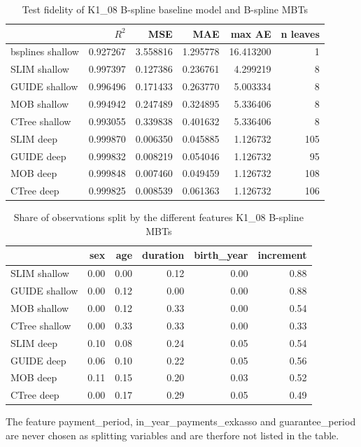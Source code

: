 \begin{table}[!htb]
\caption{Test fidelity of K1\_08 B-spline baseline model and  B-spline MBTs}
\centering \small
\begin{tabular}[t]{l|r|r|r|r|r}
\hline
  & $R^2$ & MSE & MAE & max AE & n leaves\\
\hline
bsplines shallow & 0.927267 & 3.558816 & 1.295778 & 16.413200 & 1\\
\hline
SLIM shallow & 0.997397 & 0.127386 & 0.236761 & 4.299219 & 8\\
GUIDE shallow & 0.996496 & 0.171433 & 0.263770 & 5.003334 & 8\\
MOB shallow & 0.994942 & 0.247489 & 0.324895 & 5.336406 & 8\\
CTree shallow & 0.993055 & 0.339838 & 0.401632 & 5.336406 & 8\\
\hline
SLIM deep & 0.999870 & 0.006350 & 0.045885 & 1.126732 & 105\\
GUIDE deep & 0.999832 & 0.008219 & 0.054046 & 1.126732 & 95\\
MOB deep & 0.999848 & 0.007460 & 0.049459 & 1.126732 & 108\\
CTree deep & 0.999825 & 0.008539 & 0.061363 & 1.126732 & 106\\
\hline
\end{tabular}
\label{tab:ins_k108_bsplines_surrogates_perf_test}

\end{table}


\begin{table}[!htb]
\caption{Share of observations split by the different features K1\_08 B-spline MBTs}
\centering \small
\begin{tabular}[t]{l|r|r|r|r|r}
\hline
  & sex & age & duration & birth\_year & increment\\
\hline
SLIM shallow & 0.00 & 0.00 & 0.12 & 0.00  & 0.88\\
GUIDE shallow & 0.00 & 0.12 & 0.00 & 0.00  & 0.88\\
MOB shallow & 0.00 & 0.12 & 0.33 & 0.00  & 0.54\\
CTree shallow & 0.00 & 0.33 & 0.33 & 0.00  & 0.33\\
\hline
SLIM deep & 0.10 & 0.08 & 0.24 & 0.05 & 0.54\\
GUIDE deep & 0.06 & 0.10 & 0.22 & 0.05 & 0.56\\
MOB deep & 0.11 & 0.15 & 0.20 & 0.03 & 0.52\\
CTree deep & 0.00 & 0.17 & 0.29 & 0.05 & 0.49\\
\hline
\end{tabular}
\label{tab:ins_k108_share}
\end{table}

The feature payment\_period, in\_year\_payments\_exkasso and guarantee\_period are never chosen as splitting variables and are therfore not listed in the table.